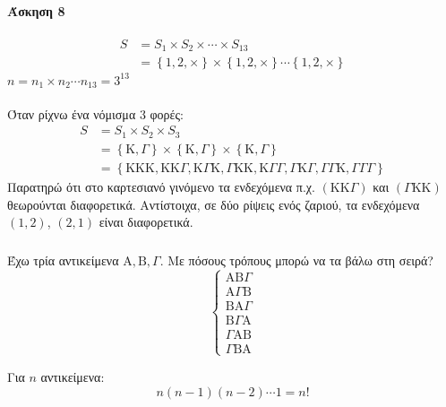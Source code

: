 \documentclass[11pt,a4paper,titlepage,draft]{article}
\begin{document}
\paragraph{Άσκηση 8}
\begin{align*}
S &= S_1 \times S_2 \times \cdots \times S_{13} \\
&=
 \left\lbrace 1,2,\times \right\rbrace
 \times
  \left\lbrace 1,2,\times \right\rbrace
  \cdots
   \left\lbrace 1,2,\times \right\rbrace
\end{align*}
\(n=n_1\times n_2 \cdots n_{13}=3^{13}\)

\paragraph{}
Όταν ρίχνω ένα νόμισμα 3 φορές:
\begin{align*}
S &= S_1 \times S_2 \times S_3 \\
&=  \left\lbrace \mathrm K, \Gamma   \right\rbrace \times  \left\lbrace \mathrm K, \Gamma  \right\rbrace\times \left\lbrace \mathrm K, \Gamma  \right\rbrace \\
&=
 \left\lbrace 
 \mathrm K\mathrm K\mathrm K,
 \mathrm K\mathrm K \Gamma ,
 \mathrm K \Gamma \mathrm K,
  \Gamma \mathrm K\mathrm K,
  \mathrm K \Gamma  \Gamma ,
   \Gamma \mathrm K \Gamma ,
    \Gamma  \Gamma \mathrm K,
     \Gamma  \Gamma  \Gamma 
  \right\rbrace
\end{align*}
Παρατηρώ ότι στο καρτεσιανό γινόμενο τα ενδεχόμενα π.χ. \((\mathrm K \mathrm K  \Gamma)\) και \((\Gamma \mathrm K \mathrm  K)\) θεωρούνται διαφορετικά. Αντίστοιχα, σε δύο ρίψεις ενός ζαριού, τα ενδεχόμενα \( (1,2)\), \((2,1)\) είναι διαφορετικά.

\subsubsection{}
Έχω τρία αντικείμενα \(\mathrm A, \mathrm B , \Gamma \). Με πόσους τρόπους μπορώ να τα βάλω στη σειρά?
\[
\begin{cases}
 \mathrm A \mathrm B  \Gamma \\
  \mathrm A \Gamma  \mathrm B \\
     \mathrm B   \mathrm A \Gamma \\
   \mathrm B  \Gamma  \mathrm A\\
    \Gamma  \mathrm A \mathrm B \\
     \Gamma  \mathrm B  \mathrm A
\end{cases}
\]

Για \(n\) αντικείμενα:
\[
n(n-1)(n-2)\cdots 1 = n!
\]
\end{document}
